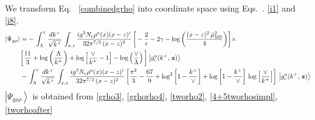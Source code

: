 \documentclass[aps,prd,amsmath,amssymb,nofootinbib]{revtex4-2}
\numberwithin{equation}{section}
\begin{document}
 We transform Eq.~ \eqref{combinedgrho} into coordinate space using Eqs.~. \eqref{i1} and \eqref{i8}.
 \begin{align}\label{grhoposition}
     \left|\Psi_{g\rho}\right\rangle & = -\,\int_{\Lambda}^{\vee}\frac{dk^{+}}{\sqrt{k^{+}}}\,\int_{x,z} \frac{ig^{3}N_{c}\rho^{a}(x)(x-z)^{i}}{32\pi^{7/2}\,(x-z)^{2}}\,\bigg[-\frac{2}{\epsilon}-2\gamma -\log{\left(\frac{(x-z)^{2}\,\Bar{\mu}_{\mathrm{MS}}^{2}}{4}\right)}\bigg]\times\notag \\ & \bigg[\frac{11}{3}+ \log{\left(\frac{\Lambda}{k^{+}}\right)}+\log{\left[\frac{\vee}{k^{+}}-1\right]}-\log\left(\frac{\vee}{\Lambda}\right)\bigg]\left|g_{i}^{a}(k^{+},\, \mathbf{z})\right\rangle \notag \\ & -\,\int_{\Lambda}^{\vee}\frac{dk^{+}}{\sqrt{k^{+}}}\,\int_{x,z} \frac{ig^{3}N_{c}\rho^{a}(x)(x-z)^{i}}{32\pi^{7/2}\,(x-z)^{2}}\,\bigg[\frac{\pi^{2}}{3} - \frac{67}{9} + \log^{2}{\left[1-\frac{k^{+}}{\vee}\right]}+\log{\left[1-\frac{k^{+}}{\vee}\right]}\,\log{\left[\frac{\vee}{k^{+}}\right]}\bigg]\, \left|g_{i}^{a}(k^{+},\, \mathbf{z})\right\rangle
\end{align}
$\left|\Psi_{g\rho\rho}\right\rangle$ is obtained from \eqref{grho3}, \eqref{grhorho4}, \eqref{tworho2}, \eqref{4+5tworhosimpl},\eqref{tworhoafter}
\end{document}
